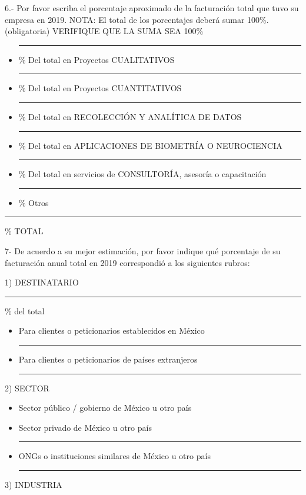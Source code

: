 6.- Por favor escriba el porcentaje aproximado de la facturación total que tuvo su empresa en 2019. NOTA: El total de los porcentajes deberá sumar 100\%. (obligatoria)
VERIFIQUE QUE LA SUMA SEA 100\%

\begin{itemize}
    \item[1)] \rule{20mm}{0.1mm} \% Del total en Proyectos CUALITATIVOS
\item[2)] \rule{20mm}{0.1mm} \% Del total en Proyectos CUANTITATIVOS
\item[3)] \rule{20mm}{0.1mm} \% Del total en RECOLECCIÓN Y ANALÍTICA DE DATOS
\item[4)] \rule{20mm}{0.1mm} \% Del total en APLICACIONES DE BIOMETRÍA O NEUROCIENCIA
\item[5)] \rule{20mm}{0.1mm} \% Del total en servicios de CONSULTORÍA, asesoría o capacitación
\item[6)] \rule{20mm}{0.1mm} \% Otros
\end{itemize}

\rule{20mm}{0.1mm} \% TOTAL

7- De acuerdo a su mejor estimación, por favor indique qué porcentaje de su facturación anual total en 2019 correspondió a los siguientes rubros:\newline

1) DESTINATARIO

\rule{20mm}{0.1mm} \% del total

\begin{itemize}
    \item[a)] Para clientes o peticionarios establecidos en México \rule{20mm}{0.1mm}
\item[b)] Para clientes o peticionarios de países extranjeros \rule{20mm}{0.1mm}
\end{itemize}

2) SECTOR

\begin{itemize}
    \item[a)] Sector público / gobierno de México u otro país
\item[b)] Sector privado de México u otro país \rule{20mm}{0.1mm}
\item[c)] ONGs o instituciones similares de México u otro país \rule{20mm}{0.1mm}
\end{itemize} 

3) INDUSTRIA

